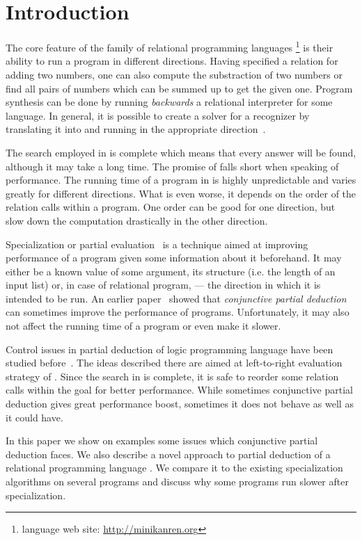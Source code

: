 \section{Introduction}

The core feature of the family of relational programming languages \mk{}\footnote{\mk{} language web site: \url{http://minikanren.org}} is their ability to run a program in different directions.
Having specified a relation for adding two numbers, one can also compute the substraction of two numbers or find all pairs of numbers which can be summed up to get the given one.
Program synthesis can be done by running \emph{backwards} a relational interpreter for some language.
In general, it is possible to create a solver for a recognizer by translating it into \mk{} and running in the appropriate direction~\cite{lozov2019relational}.

The search employed in \mk{} is complete which means that every answer will be found, although it may take a long time.
The promise of \mk{} falls short when speaking of performance.
The running time of a program in \mk{} is highly unpredictable and varies greatly for different directions.
What is even worse, it depends on the order of the relation calls within a program.
One order can be good for one direction, but slow down the computation drastically in the other direction.

Specialization or partial evaluation~\cite{jonesbook} is a technique aimed at improving performance of a program given some information about it beforehand.
It may either be a known value of some argument, its structure (i.e. the length of an input list) or, in case of relational program, --- the direction in which it is intended to be run.
An earlier paper~\cite{lozov2019relational} showed that \emph{conjunctive partial deduction}~\cite{de1999conjunctive} can sometimes improve the performance of \mk{} programs.
Unfortunately, it may also not affect the running time of a program or even make it slower.

Control issues in partial deduction of logic programming language \pro{} have been studied before~\cite{leuschel2002logic}.
The ideas described there are aimed at left-to-right evaluation strategy of \pro{}.
Since the search in \mk{} is complete, it is safe to reorder some relation calls within the goal for better performance.
While sometimes conjunctive partial deduction gives great performance boost, sometimes it does not behave as well as it could have.

In this paper we show on examples some issues which conjunctive partial deduction faces.
We also describe a novel approach to partial deduction of a relational programming language \mk{}.
We compare it to the existing specialization algorithms on several programs and discuss why some \mk{} programs run slower after specialization.
